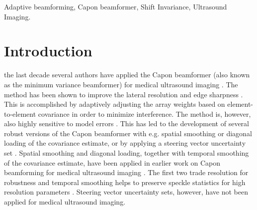 \documentclass[journal]{IEEEtran}
\begin{document}
\begin{IEEEkeywords}
Adaptive beamforming, Capon beamformer, Shift Invariance, Ultrasound Imaging.
\end{IEEEkeywords}






%
\IEEEpeerreviewmaketitle



\section{Introduction}
% 
% 
% 
% 

 the last decade several authors have applied the Capon beamformer (also known as the minimum variance beamformer) for medical ultrasound imaging \cite{Synnevag2007, Vignon2008, Viola}. The method has been shown to improve the lateral resolution and edge sharpness \cite{Synnevag2007, Synnevag2009, Chen2011}. This is accomplished by adaptively adjusting the array weights based on element-to-element covariance in order to minimize interference. The method is, however, also highly sensitive to model errors \cite{Mestre2006, Widrow1982, Wax1996, Wax1996a}. This has led to the development of several robust versions of the Capon beamformer with e.g. spatial smoothing \cite{Shan1985} or diagonal loading \cite{JianLi2003} of the covariance estimate, or by applying a steering vector uncertainty set \cite{Lorenz2005, Rubsamen2013}. Spatial smoothing and diagonal loading, together with temporal smoothing of the covariance estimate, have been applied in earlier work on Capon beamforming for medical ultrasound imaging \cite{Synnevag2009}. The first two trade resolution for robustness and temporal smoothing helps to preserve speckle statistics for high resolution parameters \cite{Synnevag2007a}. Steering vector uncertainty sets, however, have not been applied for medical ultrasound imaging.
\end{document}
